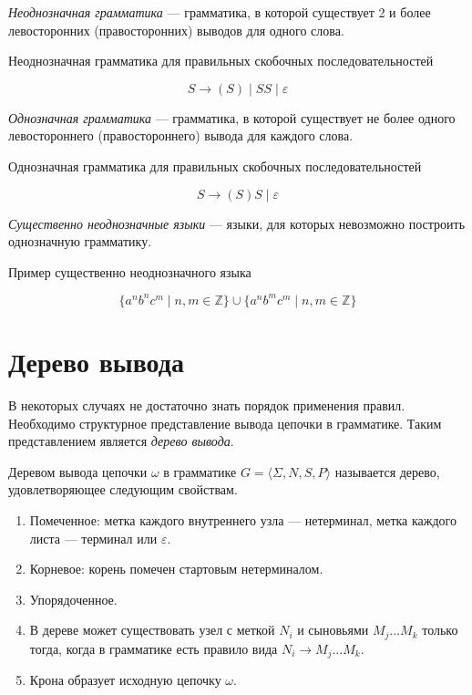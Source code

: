 \begin{definition}
  \textit{Неоднозначная грамматика} --- грамматика, в которой существует 2 и более левосторонних (правосторонних) выводов для одного слова.
\end{definition}

\begin{example}
  Неоднозначная грамматика для правильных скобочных последовательностей

\[
    S \to (S) \mid S S \mid \varepsilon
\]
\end{example}

\begin{definition}
  \textit{Однозначная грамматика} --- грамматика, в которой существует не более одного левостороннего (правостороннего) вывода для каждого слова.
\end{definition}

\begin{example}
  Однозначная грамматика для правильных скобочных последовательностей

\[
    S \to (S)S \mid \varepsilon
\]
\end{example}

\begin{definition}
  \textit{Существенно неоднозначные языки} --- языки, для которых невозможно построить однозначную грамматику.
\end{definition}

\begin{example}
  Пример существенно неоднозначного языка

\[\{a^n b^n c^m \mid n, m \in \mathds{Z}\} \cup \{a^n b^m c^m \mid n,m \in \mathds{Z}\}\]
\end{example}

\section{Дерево вывода}\label{sect:DerivTree}
В некоторых случаях не достаточно знать порядок применения правил.
Необходимо структурное представление вывода цепочки в грамматике.
Таким представлением является \textit{дерево вывода}.
\begin{definition}
Деревом вывода цепочки $\omega$ в грамматике $G=\langle \Sigma, N, S, P \rangle$ называется дерево, удовлетворяющее следующим свойствам.

\begin{enumerate}
  \item Помеченное: метка каждого внутреннего узла --- нетерминал, метка каждого листа --- терминал или $\varepsilon$.
  \item Корневое: корень помечен стартовым нетерминалом.
  \item Упорядоченное.
  \item В дереве может существовать узел с меткой $N_i$ и сыновьями $M_j \dots M_k$ только тогда, когда в грамматике есть правило вида $N_i \to M_j \dots M_k$.
  \item Крона образует исходную цепочку $\omega$.
\end{enumerate}
\end{definition}

